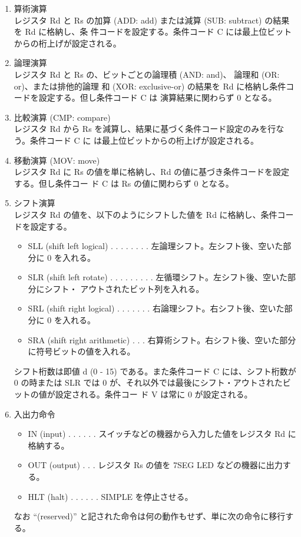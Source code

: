 \documentclass[a4paper,11pt,oneside,openany]{jsarticle}
\begin{document}
\begin{enumerate}
  \item 算術演算\\
  レジスタ Rd と Rs の加算 (ADD: add) または減算 (SUB: subtract) の結果を Rd に格納し、条
  件コードを設定する。条件コード C には最上位ビットからの桁上げが設定される。
  \item  論理演算\\レジスタ Rd と Rs の、ビットごとの論理積 (AND: and)、 論理和 (OR: or)、または排他的論理
  和 (XOR: exclusive-or) の結果を Rd に格納し条件コードを設定する。但し条件コード C は
  演算結果に関わらず 0 となる。
  \item 比較演算 (CMP: compare)\\レジスタ Rd から Rs を減算し、結果に基づく条件コード設定のみを行なう。条件コード C に
  は最上位ビットからの桁上げが設定される。
  \item 移動演算 (MOV: move)\\レジスタ Rd に Rs の値を単に格納し、Rd の値に基づき条件コードを設定する。但し条件コー
  ド C は Rs の値に関わらず 0 となる。
  \item シフト演算\\レジスタ Rd の値を、以下のようにシフトした値を Rd に格納し、条件コードを設定する。
  \begin{itemize}
    \item SLL (shift left logical) . . . . . . . . 左論理シフト。左シフト後、空いた部分に 0 を入れる。
    \item SLR (shift left rotate) . . . . . . . . . 左循環シフト。左シフト後、空いた部分にシフト・
    アウトされたビット列を入れる。
    \item SRL (shift right logical) . . . . . . . 右論理シフト。右シフト後、空いた部分に 0 を入れる。
    \item SRA (shift right arithmetic) . . . 右算術シフト。右シフト後、空いた部分に符号ビットの値を入れる。
  \end{itemize}
  シフト桁数は即値 d (0 - 15) である。また条件コード C には、シフト桁数が 0 の時または
  SLR では 0 が、それ以外では最後にシフト・アウトされたビットの値が設定される。条件コー
  ド V は常に 0 が設定される。
  \item 入出力命令
  \begin{itemize}
    \item IN (input) . . . . . . スイッチなどの機器から入力した値をレジスタ Rd に格納する。
    \item OUT (output) . . . レジスタ Rs の値を 7SEG LED などの機器に出力する。
    \item HLT (halt) . . . . . . SIMPLE を停止させる。
  \end{itemize}
  なお “(reserved)” と記された命令は何の動作もせず、単に次の命令に移行する。
\end{enumerate}
\end{document}
